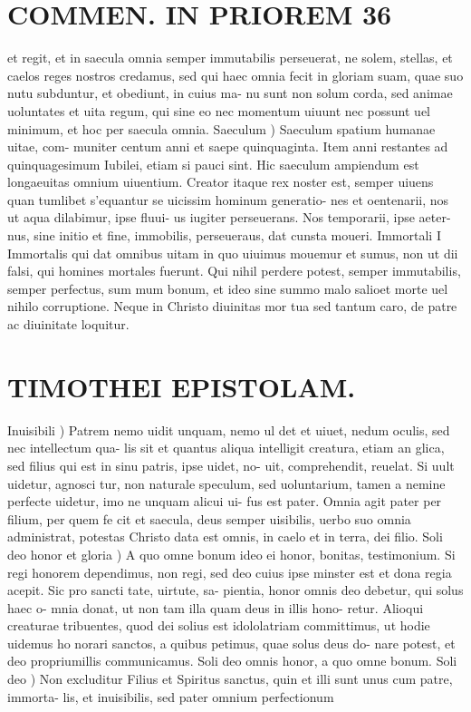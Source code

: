 \documentclass{article}
\begin{document}
\begin{pages}
\section*{COMMEN. IN PRIOREM 36 }
\marginpar{[ p.36 ]}\pstart et regit, et in saecula omnia semper immutabilis perseuerat, ne solem, stellas, et caelos reges nostros credamus, sed qui haec omnia fecit in gloriam suam, quae suo nutu subduntur, et obediunt, in cuius ma- nu sunt non solum corda, sed animae uoluntates et uita regum, qui sine eo nec momentum uiuunt nec possunt uel minimum, et hoc per saecula omnia.  \pend\pstart Saeculum ) Saeculum spatium humanae uitae, com- muniter centum anni et saepe quinquaginta. Item anni restantes ad quinquagesimum Iubilei, etiam si pauci sint. Hic saeculum ampiendum est longaeuitas omnium uiuentium.  \pend\pstart Creator itaque rex noster est, semper uiuens quan tumlibet s’equantur se uicissim hominum generatio- nes et oentenarii, nos ut aqua dilabimur, ipse fluui- us iugiter perseuerans. Nos temporarii, ipse aeter- nus, sine initio et fine, immobilis, perseueraus, dat cunsta moueri.  \pend\pstart Immortali I Immortalis qui dat omnibus uitam in quo uiuimus mouemur et sumus, non ut dii falsi, qui homines mortales fuerunt. Qui nihil perdere potest, semper immutabilis, semper perfectus, sum mum bonum, et ideo sine summo malo salioet morte uel nihilo corruptione. Neque in Christo diuinitas mor tua sed tantum caro, de patre ac diuinitate loquitur.  \pend
\section*{TIMOTHEI EPISTOLAM. }
\marginpar{[ p.37 ]}\pstart Inuisibili ) Patrem nemo uidit unquam, nemo ul det et uiuet, nedum oculis, sed nec intellectum qua- lis sit et quantus aliqua intelligit creatura, etiam an glica, sed filius qui est in sinu patris, ipse uidet, no- uit, comprehendit, reuelat. Si uult uidetur, agnosci tur, non naturale speculum, sed uoluntarium, tamen a nemine perfecte uidetur, imo ne unquam alicui ui- fus est pater. Omnia agit pater per filium, per quem fe cit et saecula, deus semper uisibilis, uerbo suo omnia administrat, potestas Christo data est omnis, in caelo et in terra, dei filio.  \pend\pstart Soli deo honor et gloria ) A quo omne bonum ideo ei honor, bonitas, testimonium. Si regi honorem dependimus, non regi, sed deo cuius ipse minster est et dona regia acepit. Sic pro sancti tate, uirtute, sa- pientia, honor omnis deo debetur, qui solus haec o- mnia donat, ut non tam illa quam deus in illis hono- retur. Alioqui creaturae tribuentes, quod dei solius est idololatriam committimus, ut hodie uidemus ho norari sanctos, a quibus petimus, quae solus deus do- nare potest, et deo propriumillis communicamus. Soli deo omnis honor, a quo omne bonum.  \pend\pstart Soli deo ) Non excluditur Filius et Spiritus sanctus, quin et illi sunt unus cum patre, immorta- lis, et inuisibilis, sed pater omnium perfectionum  \pend

\end{pages}
\end{document}
